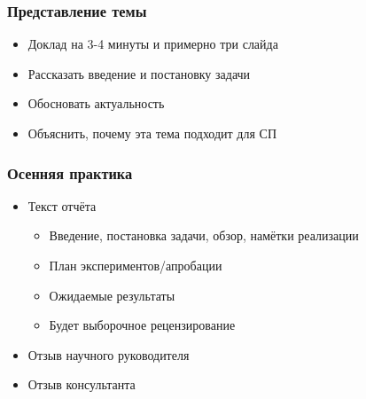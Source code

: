 \documentclass[xetex,mathserif,serif]{beamer}
\begin{document}
    \begin{frame}
        \frametitle{Представление темы}
        \begin{itemize}
            \item Доклад на 3-4 минуты и примерно три слайда
            \item Рассказать введение и постановку задачи
            \item Обосновать актуальность
            \item Объяснить, почему эта тема подходит для СП
        \end{itemize}
    \end{frame}

    \begin{frame}
        \frametitle{Осенняя практика}
        \begin{itemize}
            \item Текст отчёта
            \begin{itemize}
                \item Введение, постановка задачи, обзор, намётки реализации
                \item План экспериментов/апробации
                \item Ожидаемые результаты
                \item Будет выборочное рецензирование
            \end{itemize} 
            \item Отзыв научного руководителя
            \item Отзыв консультанта
        \end{itemize}
    \end{frame}
\end{document}

